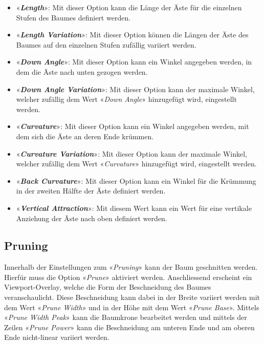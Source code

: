 \documentclass[
]{book}
\providecommand{\tightlist}{%
  \setlength{\itemsep}{0pt}\setlength{\parskip}{0pt}}\usepackage{longtable,booktabs,array}
\let\oldmarginnote\marginnote
\renewcommand{\marginnote}[1]{%
  \oldmarginnote{{\footnotesize\selectfont #1}}%
}
\begin{document}
\begin{itemize}
\tightlist
\item
  «\textbf{\emph{Length}}»: Mit dieser Option kann die Länge der Äste
  für die einzelnen Stufen des Baumes definiert werden.
\item
  «\textbf{\emph{Length Variation}}»: Mit dieser Option können die
  Längen der Äste des Baumes auf den einzelnen Stufen zufällig variiert
  werden.
\item
  «\textbf{\emph{Down Angle}}»: Mit dieser Option kann ein Winkel
  angegeben werden, in dem die Äste nach unten gezogen werden.
\item
  «\textbf{\emph{Down Angle Variation}}»: Mit dieser Option kann der
  maximale Winkel, welcher zufällig dem Wert «\emph{Down Angle}»
  hinzugefügt wird, eingestellt werden.
\item
  «\textbf{\emph{Curvature}}»: Mit dieser Option kann ein Winkel
  angegeben werden, mit dem sich die Äste an deren Ende krümmen.
\item
  «\textbf{\emph{Curvature Variation}}»: Mit dieser Option kann der
  maximale Winkel, welcher zufällig dem Wert «\emph{Curvature}»
  hinzugefügt wird, eingestellt werden.
\item
  «\textbf{\emph{Back Curvature}}»: Mit dieser Option kann ein Winkel
  für die Krümmung in der zweiten Hälfte der Äste definiert werden.
\item
  «\textbf{\emph{Vertical Attraction}}»: Mit diesem Wert kann ein Wert
  für eine vertikale Anziehung der Äste nach oben definiert werden.
\end{itemize}

\subsection{Pruning}\label{pruning}

\marginnote{Bäume beschneiden}

Innerhalb der Einstellungen zum «\emph{Pruning}» kann der Baum
geschnitten werden. Hierfür muss die Option «\emph{Prune}» aktiviert
werden. Anschliessend erscheint ein Viewport-Overlay, welche die Form
der Beschneidung des Baumes veranschaulicht. Diese Beschneidung kann
dabei in der Breite variiert werden mit dem Wert «\emph{Prune Width}»
und in der Höhe mit dem Wert «\emph{Prune Base}». Mittels «\emph{Prune
Width Peak}» kann die Baumkrone bearbeitet werden und mittels der Zeilen
«\emph{Prune Power}» kann die Beschneidung am unteren Ende und am oberen
Ende nicht-linear variiert werden.
\end{document}
